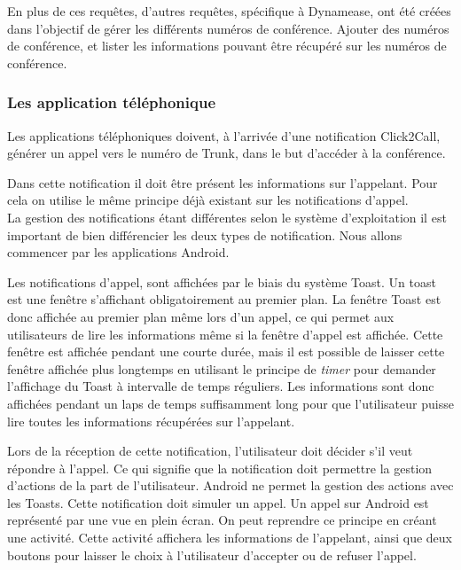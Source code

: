 En plus de ces requêtes, d'autres requêtes, spécifique à Dynamease, ont été créées dans l'objectif de gérer les différents numéros de conférence. Ajouter des numéros de conférence, et lister les informations pouvant être récupéré  sur les numéros de conférence.

\subsubsection{Les application téléphonique} 

Les applications téléphoniques doivent, à l'arrivée d'une notification Click2Call, générer un appel vers le numéro de Trunk, dans le but d'accéder à la conférence.

Dans cette notification il doit être présent les informations sur l'appelant. Pour cela on utilise le même principe déjà existant sur les notifications d'appel.\\

La gestion des notifications étant différentes selon le système d'exploitation il est important de bien différencier les deux types de notification. Nous allons commencer par les applications Android.

Les notifications d'appel, sont affichées par le biais du système Toast. Un toast est une fenêtre s'affichant obligatoirement au premier plan. La fenêtre Toast est donc affichée au premier plan même lors d'un appel, ce qui permet aux utilisateurs de lire les informations même si la fenêtre d'appel est affichée. Cette fenêtre est affichée pendant une courte durée, mais il est possible de laisser cette fenêtre affichée plus longtemps en utilisant le principe de \textit{timer} pour demander l'affichage du Toast à intervalle de temps réguliers. Les informations sont donc affichées pendant un laps de temps suffisamment long pour que l'utilisateur puisse lire toutes les informations récupérées sur l'appelant.

Lors de la réception de cette notification, l'utilisateur doit décider s'il veut répondre à l'appel. Ce qui signifie que la notification doit permettre la gestion d'actions de la part de l'utilisateur. Android ne permet la gestion des actions avec les Toasts. Cette notification doit simuler un appel. Un appel sur Android est représenté par une vue en plein écran. On peut reprendre ce principe en créant une activité. Cette activité affichera les informations de l'appelant, ainsi que deux boutons pour laisser le choix à l'utilisateur d'accepter ou de refuser l'appel.

